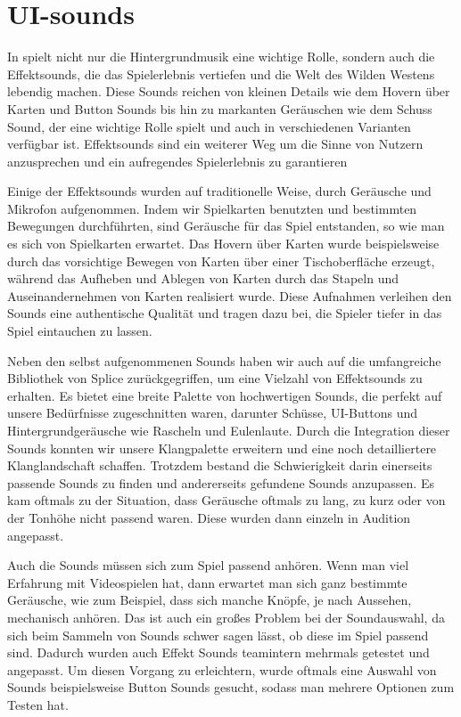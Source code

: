 
\section{UI-sounds}\label{sec:ui-sounds}

\renewcommand{\kapitelautor}{Autor: Nils Hubmann} %

%
In \ff spielt nicht nur die Hintergrundmusik eine wichtige Rolle, sondern auch die Effektsounds, die das Spielerlebnis vertiefen und die Welt des Wilden Westens lebendig machen.
Diese Sounds reichen von kleinen Details wie dem Hovern über Karten und Button Sounds bis hin zu markanten Geräuschen wie dem Schuss Sound, der eine wichtige Rolle spielt und auch in verschiedenen Varianten verfügbar ist.
Effektsounds sind ein weiterer Weg um die Sinne von Nutzern anzusprechen und ein aufregendes Spielerlebnis zu garantieren

Einige der Effektsounds wurden auf traditionelle Weise, durch Geräusche und Mikrofon aufgenommen. Indem wir Spielkarten benutzten und bestimmten Bewegungen durchführten, sind Geräusche für das Spiel entstanden, so wie man es sich von Spielkarten erwartet.
Das Hovern über Karten wurde beispielsweise durch das vorsichtige Bewegen von Karten über einer Tischoberfläche erzeugt, während das Aufheben und Ablegen von Karten durch das Stapeln und Auseinandernehmen von Karten realisiert wurde.
Diese Aufnahmen verleihen den Sounds eine authentische Qualität und tragen dazu bei, die Spieler tiefer in das Spiel eintauchen zu lassen.

Neben den selbst aufgenommenen Sounds haben wir auch auf die umfangreiche Bibliothek von Splice zurückgegriffen, um eine Vielzahl von Effektsounds zu erhalten.
Es bietet eine breite Palette von hochwertigen Sounds, die perfekt auf unsere Bedürfnisse zugeschnitten waren, darunter Schüsse, UI-Buttons und Hintergrundgeräusche wie Rascheln und Eulenlaute.
Durch die Integration dieser Sounds konnten wir unsere Klangpalette erweitern und eine noch detailliertere Klanglandschaft schaffen.
Trotzdem bestand die Schwierigkeit darin einerseits passende Sounds zu finden und andererseits gefundene Sounds anzupassen.
Es kam oftmals zu der Situation, dass Geräusche oftmals zu lang, zu kurz oder von der Tonhöhe nicht passend waren. Diese wurden dann einzeln in Audition angepasst.

Auch die Sounds müssen sich zum Spiel passend anhören. Wenn man viel Erfahrung mit Videospielen hat, dann erwartet man sich ganz bestimmte Geräusche, wie zum Beispiel, dass sich manche Knöpfe, je nach Aussehen, mechanisch anhören.
Das ist auch ein großes Problem bei der Soundauswahl, da sich beim Sammeln von Sounds schwer sagen lässt, ob diese im Spiel passend sind. Dadurch wurden auch Effekt Sounds teamintern mehrmals getestet und angepasst.
Um diesen Vorgang zu erleichtern, wurde oftmals eine Auswahl von Sounds beispielsweise Button Sounds gesucht, sodass man mehrere Optionen zum Testen hat.

